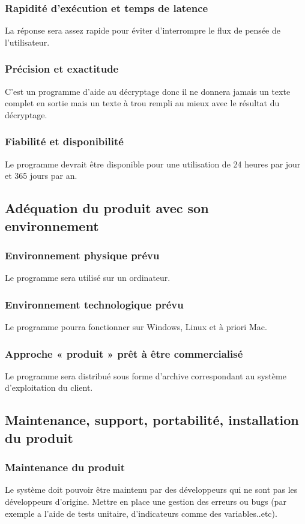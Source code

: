 \documentclass[a4]{article}
\begin{document}
			\subsubsection {Rapidité d’exécution et temps de latence}
				La réponse sera assez rapide pour éviter d’interrompre le flux de pensée de l’utilisateur.

			\subsubsection {Précision et exactitude}
				C'est un programme d'aide au décryptage donc il ne donnera jamais un texte complet en sortie 					mais un texte à trou rempli au mieux avec le résultat du décryptage.
			\subsubsection {Fiabilité et disponibilité}
				Le programme devrait être disponible pour une utilisation de 24 heures par jour et 365 jours
				par an. 

		\subsection{Adéquation du produit avec son environnement}
			\subsubsection {Environnement physique prévu}
				Le programme sera utilisé sur un ordinateur.
			\subsubsection {Environnement technologique prévu}
				Le programme pourra fonctionner sur Windows, Linux et à priori Mac.
			\subsubsection {Approche « produit » prêt à être commercialisé}
					Le programme sera distribué sous forme d'archive correspondant au système 						d'exploitation du client.
		\subsection{Maintenance, support, portabilité, installation du produit}
			\subsubsection {Maintenance du produit}
				Le système doit pouvoir être maintenu par des développeurs qui ne sont pas les
				développeurs d’origine.
				Mettre en place une gestion des erreurs ou bugs (par exemple a l'aide de tests unitaire, 				d'indicateurs comme des variables..etc).
\end{document}
